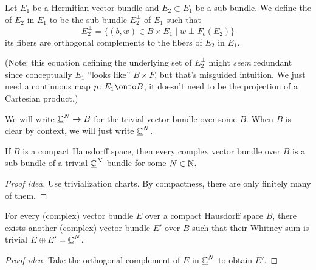 
\lecture{}

\begin{definition}
Let $E_{1}$ be a Hermitian vector bundle and $E_{2}\subset E_{1}$ be a
sub-bundle. We define the  of $E_{2}$ in
$E_{1}$ to be the sub-bundle $E_{2}^{\perp}$ of $E_{1}$ such that
\begin{equation*}
E_{2}^{\perp}=\{(b,w)\in B\times E_{1}\mid w\perp F_{b}(E_{2})\}
\end{equation*}
its fibers are orthogonal complements to the fibers of $E_{2}$ in $E_{1}$.
\end{definition}

(Note: this equation defining the underlying set of $E_{2}^{\perp}$
might \emph{seem} redundant since conceptually $E_{1}$ ``looks like''
$B\times F$, but that's misguided intuition. We just need a continuous map
$p\colon E_{1}\onto B$, it doesn't need to be the projection of a
Cartesian product.)

\begin{notation}
We will write $\underline{\mathbb{C}}^{N}\to B$ for the trivial vector bundle over
some $B$. When $B$ is clear by context, we will just write $\underline{\mathbb{C}}^{N}$.
\end{notation}

\begin{lemma}
If $B$ is a compact Hausdorff space, then every complex vector bundle
over $B$ is a sub-bundle of a trivial $\underline{\mathbb{C}}^{N}$-bundle for some $N\in\mathbb{N}$.
\end{lemma}

\begin{proof}[Proof idea]
Use trivialization charts. By compactness, there are only finitely
many of them.
\end{proof}

\begin{lemma}
For every (complex) vector bundle $E$ over a compact Hausdorff space
$B$, there exists another (complex) vector bundle $E'$ over $B$ such
that their Whitney sum is trivial $E\oplus E'=\underline{\mathbb{C}}^{N}$.
\end{lemma}

\begin{proof}[Proof idea]
Take the orthogonal complement of $E$ in $\underline{\mathbb{C}}^{N}$ to
obtain $E'$.
\end{proof}

